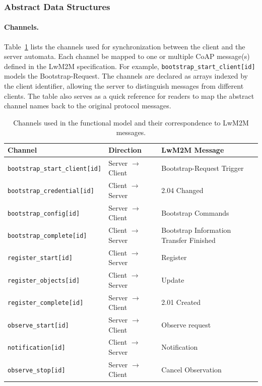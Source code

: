 \documentclass[a4paper,fleqn]{cas-sc}
\begin{document}
\subsubsection{Abstract Data Structures}

\paragraph{Channels.}
Table~\ref{tab:channels} lists the channels used for synchronization between the client and the server automata. Each channel be mapped to one or multiple CoAP message(s) defined in the LwM2M specification. For example, \texttt{bootstrap\_start\_client[id]} models the Bootstrap‑Request. The channels are declared as arrays indexed by the client identifier, allowing the server to distinguish messages from different clients. The table also serves as a quick reference for readers to map the abstract channel names back to the original protocol messages.
\begin{table}[htbp]
\centering
\caption{Channels used in the functional model and their correspondence to LwM2M messages.}
\label{tab:channels}
\begin{tabular}{lll}
\toprule
\textbf{Channel} & \textbf{Direction} & \textbf{LwM2M Message} \\
\midrule
\texttt{bootstrap\_start\_client[id]}   & Server $\rightarrow$ Client & Bootstrap-Request Trigger \\
\texttt{bootstrap\_credential[id]}     & Client $\rightarrow$ Server & 2.04 Changed \\
\texttt{bootstrap\_config[id]}         & Server $\rightarrow$ Client & Bootstrap Commands \\
\texttt{bootstrap\_complete[id]}       & Client $\rightarrow$ Server & Bootstrap Information Transfer Finished \\
\midrule
\texttt{register\_start[id]}           & Client $\rightarrow$ Server & Register \\
\texttt{register\_objects[id]}         & Client $\rightarrow$ Server & Update \\
\texttt{register\_complete[id]}        & Server $\rightarrow$ Client & 2.01 Created \\
\midrule
\texttt{observe\_start[id]}            & Server $\rightarrow$ Client & Observe request \\
\texttt{notification[id]}              & Client $\rightarrow$ Server & Notification \\
\texttt{observe\_stop[id]}             & Server $\rightarrow$ Client & Cancel Observation \\
\bottomrule
\end{tabular}
\end{table}
\end{document}
